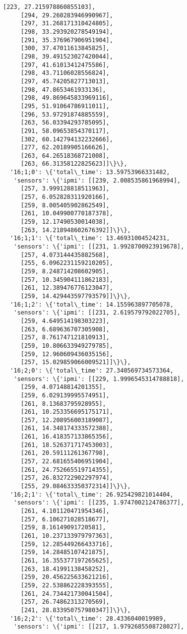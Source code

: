 \documentclass[11pt]{article}
\begin{document}
\begin{tcolorbox}[breakable, size=fbox, boxrule=.5pt, pad at break*=1mm, opacityfill=0]
\begin{Verbatim}[commandchars=\\\{\}]
     [223, 27.215978860855103],
     [294, 29.260283946990967],
     [297, 31.268171310424805],
     [298, 33.293920278549194],
     [291, 35.376967906951904],
     [300, 37.47011613845825],
     [298, 39.491523027420044],
     [297, 41.61013412475586],
     [298, 43.71106028556824],
     [297, 45.74205827713013],
     [298, 47.8653461933136],
     [298, 49.869645833969116],
     [295, 51.91064786911011],
     [296, 53.97291874885559],
     [263, 56.03394293785095],
     [291, 58.09653854370117],
     [302, 60.142794132232666],
     [277, 62.20189905166626],
     [263, 64.26518368721008],
     [263, 66.31358122825623]]\}\},
  '16;1;0': \{'total\_time': 13.59753966331482,
   'sensors': \{'ipmi': [[239, 2.008535861968994],
     [257, 3.999128818511963],
     [257, 6.052828311920166],
     [259, 8.005405902862549],
     [261, 10.049900770187378],
     [259, 12.17490530014038],
     [263, 14.218948602676392]]\}\},
  '16;1;1': \{'total\_time': 13.46931004524231,
   'sensors': \{'ipmi': [[231, 1.9928700923919678],
     [257, 4.073144435882568],
     [255, 6.0962231159210205],
     [259, 8.248714208602905],
     [257, 10.345904111862183],
     [261, 12.389476776123047],
     [259, 14.429443597793579]]\}\},
  '16;1;2': \{'total\_time': 14.155963897705078,
   'sensors': \{'ipmi': [[231, 2.619579792022705],
     [259, 4.649514198303223],
     [263, 6.689636707305908],
     [257, 8.761747121810913],
     [259, 10.806633949279785],
     [259, 12.960609436035156],
     [257, 15.029859066009521]]\}\},
  '16;2;0': \{'total\_time': 27.340569734573364,
   'sensors': \{'ipmi': [[229, 1.9996545314788818],
     [259, 4.07148814201355],
     [259, 6.029139995574951],
     [261, 8.13683795928955],
     [261, 10.253356695175171],
     [257, 12.208956003189087],
     [261, 14.348174333572388],
     [261, 16.418357133865356],
     [261, 18.526371717453003],
     [261, 20.59111261367798],
     [257, 22.681655406951904],
     [261, 24.752665519714355],
     [257, 26.832722902297974],
     [255, 29.084633350372314]]\}\},
  '16;2;1': \{'total\_time': 26.925429821014404,
   'sensors': \{'ipmi': [[235, 1.9747002124786377],
     [261, 4.101120471954346],
     [257, 6.106271028518677],
     [259, 8.16149091720581],
     [261, 10.237133979797363],
     [259, 12.285449266433716],
     [259, 14.28485107421875],
     [261, 16.355377197265625],
     [263, 18.41991138458252],
     [259, 20.456225633621216],
     [259, 22.538862228393555],
     [261, 24.734421730041504],
     [257, 26.74862313270569],
     [241, 28.833950757980347]]\}\},
  '16;2;2': \{'total\_time': 28.4336040019989,
   'sensors': \{'ipmi': [[217, 1.9792685508728027],

\end{Verbatim}
\end{tcolorbox}
\end{document}
